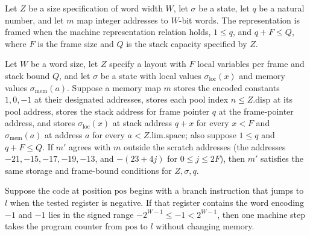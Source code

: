 \begin{definition}
\label{Light.Compiler.Framed}
\leanok
{}
Let $Z$ be a size specification of word width $W$, let $\sigma$ be a state, let $q$ be a
natural number, and let $m$ map integer addresses to $W$-bit words. The representation
is framed when the machine representation relation holds, $1\le q$, and $q+F\le Q$,
where $F$ is the frame size and $Q$ is the stack capacity specified by $Z$.
\end{definition}

\begin{theorem}
\label{Light.Compiler.Framed.same}
\leanok
{}
Let $W$ be a word size, let $Z$ specify a layout with $F$ local variables per frame and
stack bound $Q$, and let $\sigma$ be a state with local values
$\sigma_{\mathrm{loc}}(x)$ and memory values $\sigma_{\mathrm{mem}}(a)$. Suppose a
memory map $m$ stores the encoded constants $1,0,-1$ at their designated addresses,
stores each pool index $n\le Z.\mathrm{disp}$ at its pool address, stores the stack
address for frame pointer $q$ at the frame-pointer address, and stores
$\sigma_{\mathrm{loc}}(x)$ at stack address $q+x$ for every $x<F$ and
$\sigma_{\mathrm{mem}}(a)$ at address $a$ for every $a<Z.\mathrm{lim}.\mathrm{space}$;
also suppose $1\le q$ and $q+F\le Q$. If $m'$ agrees with $m$ outside the scratch
addresses (the addresses $-21,-15,-17,-19,-13$, and $-(23+4j)$ for $0\le j\le 2F$), then
$m'$ satisfies the same storage and frame-bound conditions for $Z,\sigma,q$.
\end{theorem}

\begin{theorem}
\label{Light.Compiler.steps_jump}
\leanok
{}
Suppose the code at position $\mathrm{pos}$ begins with a branch instruction that jumps
to $l$ when the tested register is negative. If that register contains the word encoding
$-1$ and $-1$ lies in the signed range $-2^{W-1}\le -1<2^{W-1}$, then one machine step
takes the program counter from $\mathrm{pos}$ to $l$ without changing memory.
\end{theorem}

